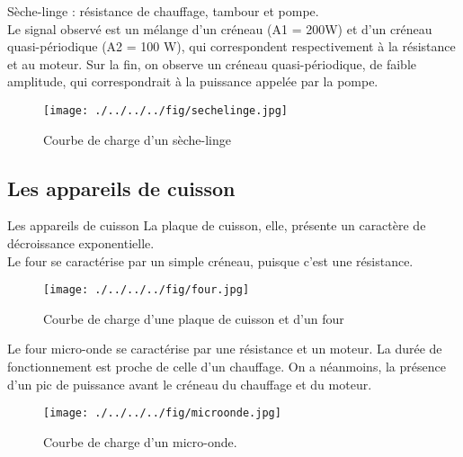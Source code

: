 \documentclass{beamer}
\begin{document}
\begin{frame}
Sèche-linge : résistance de chauffage, tambour et pompe.\\
\vspace{0.25cm}
Le signal observé est un mélange d'un créneau (A1 = 200W) et d'un créneau quasi-périodique (A2 = 100 W), qui correspondent respectivement à la résistance et au moteur. Sur la fin, on observe un créneau quasi-périodique, de faible amplitude, qui correspondrait à la puissance appelée par la pompe.
\begin{figure}[!h]
\begin{center}
\texttt{[image: ./../../../fig/sechelinge.jpg]}
\caption{Courbe de charge d'un sèche-linge}
\label{Figure11}
\end{center}
\end{figure}
\end{frame}

\subsection{Les appareils de cuisson}
\begin{frame}{Les appareils de cuisson}
La plaque de cuisson, elle, présente un caractère de décroissance exponentielle.\\
Le four se caractérise par un simple créneau, puisque c'est une résistance.
\begin{figure}[!h]
\begin{center}
\texttt{[image: ./../../../fig/four.jpg]}
\caption{Courbe de charge d'une plaque de cuisson et d'un four}
\label{Figure12}
\end{center}
\end{figure}
\end{frame}

\begin{frame}
Le four micro-onde se caractérise par une résistance et un moteur. La durée de fonctionnement est proche de celle d'un chauffage. On a néanmoins, la présence d'un pic de puissance avant le créneau du chauffage et du moteur.
\begin{figure}[!h]
\begin{center}
\texttt{[image: ./../../../fig/microonde.jpg]}
\caption{Courbe de charge d'un micro-onde.}
\label{Figure12}
\end{center}
\end{figure}
\end{frame}
\end{document}
